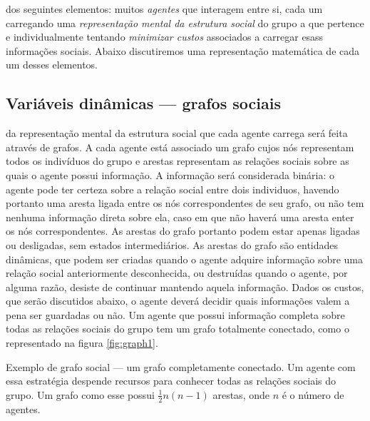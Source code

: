  dos seguintes elementos: muitos \emph{agentes} que interagem entre si, cada um carregando uma \emph{representação mental da estrutura social} do grupo a que pertence e individualmente tentando \emph{minimizar custos} associados a carregar esass informações sociais. Abaixo discutiremos uma representação matemática de cada um desses elementos. 

\subsection{Variáveis dinâmicas --- grafos sociais}

 da representação mental da estrutura social que cada agente carrega será feita através de grafos. A cada agente está associado um grafo cujos nós representam todos os indivíduos do grupo e arestas representam as relações sociais sobre as quais o agente possui informação. A informação será considerada binária: o agente pode ter certeza sobre a relação social entre dois individuos, havendo portanto uma aresta ligada entre os nós correspondentes de seu grafo, ou não tem nenhuma informação direta sobre ela, caso em que não haverá uma aresta enter os nós correspondentes. As arestas do grafo portanto podem estar apenas ligadas ou desligadas, sem estados intermediários. As arestas do grafo são entidades dinâmicas, que podem ser criadas quando o agente adquire informação sobre uma relação social anteriormente desconhecida, ou destruídas quando o agente, por alguma razão, desiste de continuar mantendo aquela informação. Dados os custos, que serão discutidos abaixo, o agente deverá decidir quais informações valem a pena ser guardadas ou não. Um agente que possui informação completa sobre todas as relações sociais do grupo tem um grafo totalmente conectado, como o representado na figura \ref{fig:graph1}. 
\begin{marginfigure}
 \caption[Grafo totalmente conectado]{Exemplo de grafo social --- um grafo completamente conectado. Um agente com essa estratégia despende recursos para conhecer todas as relações sociais do grupo. Um grafo como esse possui $\frac{1}{2} n(n-1)$ arestas, onde $n$ é o número de agentes.}
 \label{fig:graph1}
 \end{marginfigure}
 
